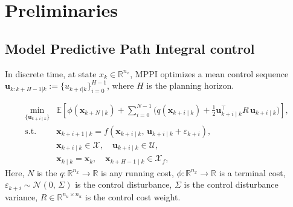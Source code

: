 \documentclass[letterpaper, 10 pt, conference]{ieeeconf}
\begin{document}
\section{Preliminaries}
\subsection{Model Predictive Path Integral control}
In discrete time, at state $x_k\in\mathbb R^{n_x}$, MPPI optimizes a mean control sequence $\mathbf u_{k:k+H-1|k}:=\{u_{k+i|k}\}_{i=0}^{H-1}$, where $H$ is the planning horizon.

\begin{subequations}
\label{eq:mppi}
\begin{align}
\min_{\{\mathbf{u}_{k+i\mid k}\}}
& \mathbb{E}\!\left[
\phi\!\left(\mathbf{x}_{k+N\mid k}\right)
\!+\!\!\sum_{i=0}^{N-1}\Big(q(\mathbf{x}_{k+i\mid k})\!+\!\tfrac{1}{2}\mathbf{u}_{k+i\mid k}^\top R\,\mathbf{u}_{k+i\mid k}\Big)
\right], \label{eq:mppi-cost} \tag{1a}\\
\text{s.t.}\quad
& \mathbf{x}_{k+i+1\mid k}=f\!\left(\mathbf{x}_{k+i\mid k},\,\mathbf{u}_{k+i\mid k}+\varepsilon_{k+i}\right), 
\label{eq:mppi-dyn}  \tag{1b}\\
& \mathbf{x}_{k+i\mid k} \in \mathcal{X}, \quad \mathbf{u}_{k+i\mid k} \in \mathcal{U}, \label{eq:mppi-set1} \tag{1c} \\
& \mathbf{x}_{k\mid k}=\mathbf{x}_k, \quad \mathbf{x}_{k+H-1\mid k} \in \mathcal{X}_f,\qquad \label{eq:mppi-set2} \tag{1d}
\end{align}
\end{subequations}
Here, $N$ is the $q: \mathbb{R}^{n_x} \rightarrow \mathbb{R}$ is any running cost, $\phi : \mathbb{R}^{n_x} \rightarrow \mathbb{R}$ is a terminal cost, $\varepsilon_{k+i}\sim\mathcal{N}(0,\,\Sigma)$ is the control disturbance, $\Sigma$ is the control disturbance variance, $R \in \mathbb{R}^{n_u \times n_u}$ is the control cost weight.
\end{document}
